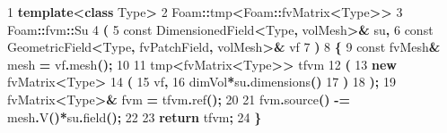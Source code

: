 \documentclass[
]{book}
\newenvironment{Shaded}{\begin{snugshade}}{\end{snugshade}}
\newcommand{\AttributeTok}[1]{\textcolor[rgb]{0.77,0.63,0.00}{#1}}
\newcommand{\ControlFlowTok}[1]{\textcolor[rgb]{0.13,0.29,0.53}{\textbf{#1}}}
\newcommand{\DecValTok}[1]{\textcolor[rgb]{0.00,0.00,0.81}{#1}}
\newcommand{\KeywordTok}[1]{\textcolor[rgb]{0.13,0.29,0.53}{\textbf{#1}}}
\newcommand{\NormalTok}[1]{#1}
\newcommand{\OperatorTok}[1]{\textcolor[rgb]{0.81,0.36,0.00}{\textbf{#1}}}
\begin{document}
\begin{Shaded}
\begin{Highlighting}[]
\DecValTok{1}   \KeywordTok{template}\OperatorTok{\textless{}}\KeywordTok{class}\NormalTok{ Type}\OperatorTok{\textgreater{}}
\DecValTok{2}\NormalTok{   Foam}\OperatorTok{::}\NormalTok{tmp}\OperatorTok{\textless{}}\NormalTok{Foam}\OperatorTok{::}\NormalTok{fvMatrix}\OperatorTok{\textless{}}\NormalTok{Type}\OperatorTok{\textgreater{}\textgreater{}}
\DecValTok{3}\NormalTok{   Foam}\OperatorTok{::}\NormalTok{fvm}\OperatorTok{::}\NormalTok{Su}
\DecValTok{4}   \OperatorTok{(}
\DecValTok{5}       \AttributeTok{const}\NormalTok{ DimensionedField}\OperatorTok{\textless{}}\NormalTok{Type}\OperatorTok{,}\NormalTok{ volMesh}\OperatorTok{\textgreater{}\&}\NormalTok{ su}\OperatorTok{,}
\DecValTok{6}       \AttributeTok{const}\NormalTok{ GeometricField}\OperatorTok{\textless{}}\NormalTok{Type}\OperatorTok{,}\NormalTok{ fvPatchField}\OperatorTok{,}\NormalTok{ volMesh}\OperatorTok{\textgreater{}\&}\NormalTok{ vf}
\DecValTok{7}   \OperatorTok{)}
\DecValTok{8}   \OperatorTok{\{}
\DecValTok{9}       \AttributeTok{const}\NormalTok{ fvMesh}\OperatorTok{\&}\NormalTok{ mesh }\OperatorTok{=}\NormalTok{ vf}\OperatorTok{.}\NormalTok{mesh}\OperatorTok{();}
\DecValTok{10}  
\DecValTok{11}\NormalTok{      tmp}\OperatorTok{\textless{}}\NormalTok{fvMatrix}\OperatorTok{\textless{}}\NormalTok{Type}\OperatorTok{\textgreater{}\textgreater{}}\NormalTok{ tfvm}
\DecValTok{12}      \OperatorTok{(}
\DecValTok{13}          \KeywordTok{new}\NormalTok{ fvMatrix}\OperatorTok{\textless{}}\NormalTok{Type}\OperatorTok{\textgreater{}}
\DecValTok{14}          \OperatorTok{(}
\DecValTok{15}\NormalTok{              vf}\OperatorTok{,}
\DecValTok{16}\NormalTok{              dimVol}\OperatorTok{*}\NormalTok{su}\OperatorTok{.}\NormalTok{dimensions}\OperatorTok{()}
\DecValTok{17}          \OperatorTok{)}
\DecValTok{18}      \OperatorTok{);}
\DecValTok{19}\NormalTok{      fvMatrix}\OperatorTok{\textless{}}\NormalTok{Type}\OperatorTok{\textgreater{}\&}\NormalTok{ fvm }\OperatorTok{=}\NormalTok{ tfvm}\OperatorTok{.}\NormalTok{ref}\OperatorTok{();}
\DecValTok{20}  
\DecValTok{21}\NormalTok{      fvm}\OperatorTok{.}\NormalTok{source}\OperatorTok{()} \OperatorTok{{-}=}\NormalTok{ mesh}\OperatorTok{.}\NormalTok{V}\OperatorTok{()*}\NormalTok{su}\OperatorTok{.}\NormalTok{field}\OperatorTok{();}
\DecValTok{22}  
\DecValTok{23}      \ControlFlowTok{return}\NormalTok{ tfvm}\OperatorTok{;}
\DecValTok{24}     \OperatorTok{\}}
\end{Highlighting}
\end{Shaded}
\end{document}
